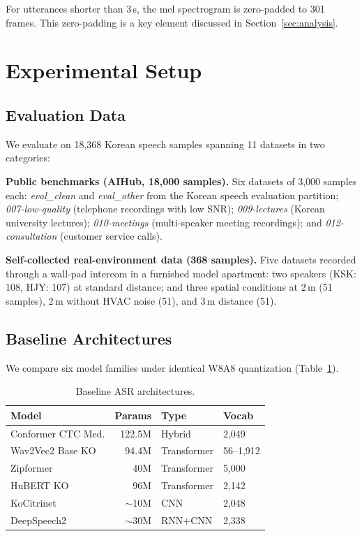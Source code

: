 \documentclass[a4paper,11pt,twocolumn]{article}
\begin{document}
For utterances shorter than 3\,s, the mel spectrogram is zero-padded to 301 frames. This zero-padding is a key element discussed in Section~\ref{sec:analysis}.

\section{Experimental Setup}

\subsection{Evaluation Data}

We evaluate on 18,368 Korean speech samples spanning 11 datasets in two categories:

\textbf{Public benchmarks (AIHub, 18,000 samples).} Six datasets of 3,000 samples each: \textit{eval\_clean} and \textit{eval\_other} from the Korean speech evaluation partition; \textit{007-low-quality} (telephone recordings with low SNR); \textit{009-lectures} (Korean university lectures); \textit{010-meetings} (multi-speaker meeting recordings); and \textit{012-consultation} (customer service calls).

\textbf{Self-collected real-environment data (368 samples).} Five datasets recorded through a wall-pad intercom in a furnished model apartment: two speakers (KSK: 108, HJY: 107) at standard distance; and three spatial conditions at 2\,m (51 samples), 2\,m without HVAC noise (51), and 3\,m distance (51).

\subsection{Baseline Architectures}

We compare six model families under identical W8A8 quantization (Table~\ref{tab:baselines}).

\begin{table}[t]
\centering
\caption{Baseline ASR architectures.}
\label{tab:baselines}
\small
\begin{tabular}{@{}lrll@{}}
\toprule
Model & Params & Type & Vocab \\
\midrule
Conformer CTC Med. & 122.5M & Hybrid & 2,049 \\
Wav2Vec2 Base KO & 94.4M & Transformer & 56--1,912 \\
Zipformer & 40M & Transformer & 5,000 \\
HuBERT KO & 96M & Transformer & 2,142 \\
KoCitrinet & ${\sim}$10M & CNN & 2,048 \\
DeepSpeech2 & ${\sim}$30M & RNN+CNN & 2,338 \\
\bottomrule
\end{tabular}
\end{table}
\end{document}
